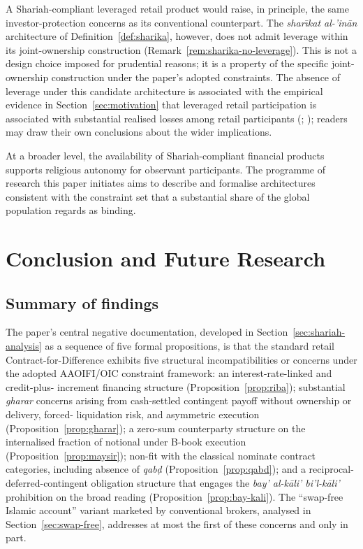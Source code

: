 \documentclass[preprint,12pt,authoryear]{elsarticle}
\theoremstyle{definition}
\begin{document}
A Shariah-compliant leveraged retail product would raise, in
principle, the same investor-protection concerns as its
conventional counterpart. The \emph{shar\={\i}kat al-'in\={a}n}
architecture of Definition~\ref{def:sharika}, however, does not
admit leverage within its joint-ownership construction
(Remark~\ref{rem:sharika-no-leverage}). This is not a design
choice imposed for prudential reasons; it is a property of the
specific joint-ownership construction under the paper's adopted
constraints. The absence of leverage under this candidate
architecture is associated with the empirical evidence in
Section~\ref{sec:motivation} that leveraged retail participation
is associated with substantial realised losses among retail
participants (\citealp{HeimerSimsek2019};
\citealp{Barber2014Taiwan}); readers may draw their own
conclusions about the wider implications.

At a broader level, the availability of Shariah-compliant
financial products supports religious autonomy for observant
participants. The programme of research this paper initiates
aims to describe and formalise architectures consistent with
the constraint set that a substantial share of the global
population regards as binding.

\section{Conclusion and Future Research}
\label{sec:conclusion}

\subsection{Summary of findings}
\label{sec:concl-summary}

The paper's central negative documentation, developed in
Section~\ref{sec:shariah-analysis} as a sequence of five formal
propositions, is that the standard retail
Contract-for-Difference exhibits five structural
incompatibilities or concerns under the adopted AAOIFI/OIC
constraint framework: an interest-rate-linked and credit-plus-
increment financing structure (Proposition~\ref{prop:riba});
substantial \emph{gharar} concerns arising from cash-settled
contingent payoff without ownership or delivery, forced-
liquidation risk, and asymmetric execution
(Proposition~\ref{prop:gharar}); a zero-sum counterparty
structure on the internalised fraction of notional under B-book
execution (Proposition~\ref{prop:maysir}); non-fit with the
classical nominate contract categories, including absence of
\emph{qab\d{d}} (Proposition~\ref{prop:qabd}); and a
reciprocal-deferred-contingent obligation structure that engages
the \emph{bay' al-k\={a}li' bi'l-k\={a}li'} prohibition on the
broad reading (Proposition~\ref{prop:bay-kali}). The
``swap-free Islamic account'' variant marketed by conventional
brokers, analysed in Section~\ref{sec:swap-free}, addresses at
most the first of these concerns and only in part.
\end{document}

